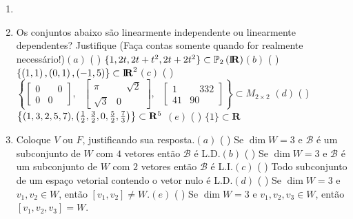 \documentclass{report}
\begin{document}
\begin{Exercise}
\begin{enumerate}

\item \label{11lista3} \item  Os conjuntos abaixo s\~{a}o
linearmente independente ou linearmente dependentes? Justifique
(Fa\c{c}a contas somente quando for realmente
necess\'{a}rio!)\newline $(a)$ ( \qquad )
$\{1,2t,2t+t^{2},2t+2t^{2}\}\subset \Bbb{P}_{2}\left(
\mbox{${\rm I}\!\mbox{\boldmath $ {\rm R}$}$}%
\right) $\newline $(b)$ ( \qquad ) $\{\left( 1,1\right) ,\left(
0,1\right) ,\left( -1,5\right) \}\subset
\mbox{${\rm I}\!\mbox{\boldmath $ {\rm R}$}$}%
^{2}$\newline $(c)$ ( \qquad ) $\left\{ \left[
\begin{array}{rr}
0 & \quad 0 \\
0 & 0
\end{array}
\right] ,\text{ }\left[
\begin{array}{rr}
\pi & \quad \sqrt{2} \\
\sqrt{3} & 0
\end{array}
\right] ,\text{ }\left[
\begin{array}{rr}
1 & \quad 332 \\
41 & 90
\end{array}
\right] \right\} \subset M_{2\times 2}$\newline
$(d)$ ( \qquad ) $\left\{ (1,3,2,5,7),\left( \frac{1}{2},\frac{3}{2},0,\frac{5%
}{2},\frac{7}{3}\right) \right\} \subset \mathbf{R}^{5}\newline $
$(e)$ ( \qquad ) $\{1\}\subset \mathbf{R}$


\item \label{12lista3} Coloque $V$ ou $F$, justificando sua
resposta.\newline $(a)$ ( \qquad ) Se $\dim W=3$ e $\mathcal{B}$
\'{e} um subconjunto de $W$ com $4$ vetores ent\~{a}o
$\mathcal{B}$ \'{e} L.D.\newline $(b)$ ( \qquad ) Se $\dim W=3$ e
$\mathcal{B}$ \'{e} um subconjunto de $W$ com $2$ vetores
ent\~{a}o $\mathcal{B}$ \'{e} L.I.\newline $(c)$ ( \qquad ) Todo
subconjunto de um espa\c{c}o vetorial contendo o vetor nulo \'{e}
L.D.\newline $(d)$ ( \qquad ) Se $\dim W=3$ e $v_{1},v_{2}\in W$,
ent\~{a}o $\left[ v_{1},v_{2}\right] \neq W$.\newline $(e)$ (
\qquad ) Se $\dim W=3$ e $v_{1},v_{2},v_{3}\in W$, ent\~{a}o
$\left[ v_{1},v_{2},v_{3}\right] =W$.


\end{enumerate}
\end{Exercise}
\end{document}
